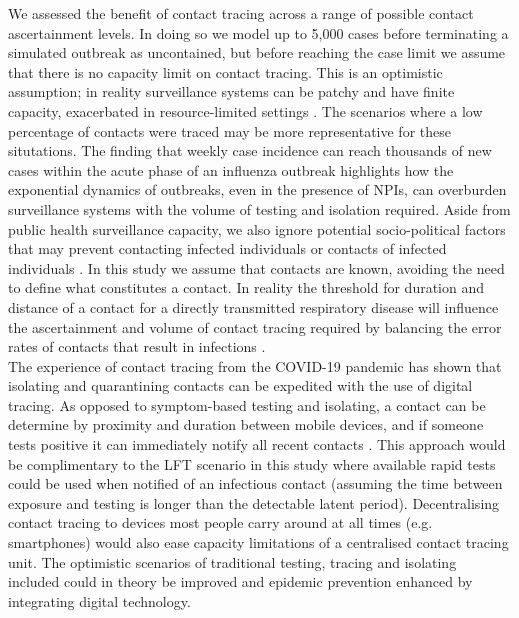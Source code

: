 \documentclass{article}
\begin{document}
We assessed the benefit of contact tracing across a range of possible contact ascertainment levels. In doing so we model up to 5,000 cases before terminating a simulated outbreak as uncontained, but before reaching the case limit we assume that there is no capacity limit on contact tracing. This is an optimistic assumption; in reality surveillance systems can be patchy and have finite capacity, exacerbated in resource-limited settings \citep{dhillonWhenContactTracing2018}. The scenarios where a low percentage of contacts were traced may be more representative for these situtations. The finding that weekly case incidence can reach thousands of new cases within the acute phase of an influenza outbreak highlights how the exponential dynamics of outbreaks, even in the presence of NPIs, can overburden surveillance systems with the volume of testing and isolation required. Aside from public health surveillance capacity, we also ignore potential socio-political factors that may prevent contacting infected individuals or contacts of infected individuals \citep{dhillonWhenContactTracing2018}. In this study we assume that contacts are known, avoiding the need to define what constitutes a contact. In reality the threshold for duration and distance of a contact for a directly transmitted respiratory disease will influence the ascertainment and volume of contact tracing required by balancing the error rates of contacts that result in infections \citep{keelingEfficacyContactTracing2020}. \\

The experience of contact tracing from the COVID-19 pandemic has shown that isolating and quarantining contacts can be expedited with the use of digital tracing. As opposed to symptom-based testing and isolating, a contact can be determine by proximity and duration between mobile devices, and if someone tests positive it can immediately notify all recent contacts \citep{ferrettiQuantifyingSARSCoV2Transmission2020}. This approach would be complimentary to the LFT scenario in this study where available rapid tests could be used when notified of an infectious contact (assuming the time between exposure and testing is longer than the detectable latent period). Decentralising contact tracing to devices most people carry around at all times (e.g. smartphones) would also ease capacity limitations of a centralised contact tracing unit. The optimistic scenarios of traditional testing, tracing and isolating included could in theory be improved and epidemic prevention enhanced by integrating digital technology. \\
\end{document}
